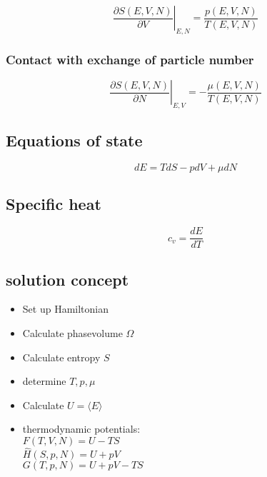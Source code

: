 \begin{equation*}
    \left. \frac{\partial S(E,V,N)}{\partial V} \right|_{E,N} = \frac{p(E,V,N)}{T(E,V,N)}
\end{equation*}

\subsubsection*{Contact with exchange of particle number}

\begin{equation*}
    \left. \frac{\partial S(E,V,N)}{\partial N} \right|_{E,V} = - \frac{\mu (E,V,N)}{T(E,V,N)}
\end{equation*}

\subsection*{Equations of state}

\begin{equation*}
    dE = TdS - pdV + \mu dN
\end{equation*}


\subsection*{Specific heat}
\begin{equation*}
    c_v = \frac{dE}{dT}
\end{equation*}
\subsection*{solution concept}

\begin{itemize}
    \itemsep 0pt
    \item Set up Hamiltonian
    \item Calculate phasevolume $\Omega$
    \item Calculate entropy $S$
    \item determine $T,p,\mu$
    \item Calculate $U = \langle E \rangle$
    \item thermodynamic potentials: \\
            $F(T,V,N) = U-TS$ \\
            $\hat{H}(S,p,N) = U + pV$ \\
            $G(T,p,N) = U + pV -TS$
\end{itemize}


